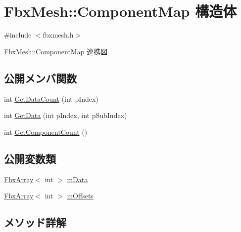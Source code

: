 \hypertarget{struct_fbx_mesh_1_1_component_map}{}\section{Fbx\+Mesh\+:\+:Component\+Map 構造体}
\label{struct_fbx_mesh_1_1_component_map}


{\ttfamily \#include $<$fbxmesh.\+h$>$}



Fbx\+Mesh\+:\+:Component\+Map 連携図
\subsection*{公開メンバ関数}
\begin{DoxyCompactItemize}
\item 
int \hyperlink{struct_fbx_mesh_1_1_component_map_a8aa6116c655638c97e9a769262bccbaa}{Get\+Data\+Count} (int p\+Index)
\item 
int \hyperlink{struct_fbx_mesh_1_1_component_map_a7fe2d0917dfc8c689704d2e38ed5082f}{Get\+Data} (int p\+Index, int p\+Sub\+Index)
\item 
int \hyperlink{struct_fbx_mesh_1_1_component_map_a51ee2a75c37cc4a7209c41fcb5e745ab}{Get\+Component\+Count} ()
\end{DoxyCompactItemize}
\subsection*{公開変数類}
\begin{DoxyCompactItemize}
\item 
\hyperlink{class_fbx_array}{Fbx\+Array}$<$ int $>$ \hyperlink{struct_fbx_mesh_1_1_component_map_a8ee6102745a5ff75b15584d1fba94c52}{m\+Data}
\item 
\hyperlink{class_fbx_array}{Fbx\+Array}$<$ int $>$ \hyperlink{struct_fbx_mesh_1_1_component_map_a1228c1a961435c616f98d14a7d853414}{m\+Offsets}
\end{DoxyCompactItemize}


\subsection{メソッド詳解}
\mbox{\label{struct_fbx_mesh_1_1_component_map_a51ee2a75c37cc4a7209c41fcb5e745ab}} 
